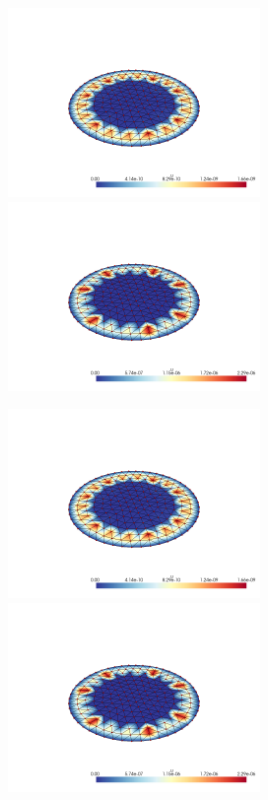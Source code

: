 \documentclass[
  11pt,
]{article}
\let\origfigure\figure
\let\endorigfigure\endfigure
\renewenvironment{figure}[1][2] {
    \expandafter\origfigure\expandafter[H]
} {
    \endorigfigure
}
\begin{document}
\begin{figure}
\caption{Finite element error in the L2 and H1 norms/seminorms, respectively for problem 1 over mesh number 2 using order 8 quadrature.}
\end{figure}

\includegraphics[width=0.5\textwidth,height=\textheight]{../img/mesh2-gauss13-L2.png}
\includegraphics[width=0.5\textwidth,height=\textheight]{../img/mesh2-gauss13-H1.png}

\begin{figure}
\caption{Finite element error in the L2 and H1 norms/seminorms, respectively for problem 1 over mesh number 2 using order 13 quadrature.}
\end{figure}

\includegraphics[width=0.5\textwidth,height=\textheight]{../img/mesh2-gauss19-L2.png}
\includegraphics[width=0.5\textwidth,height=\textheight]{../img/mesh2-gauss19-H1.png}
\end{document}
